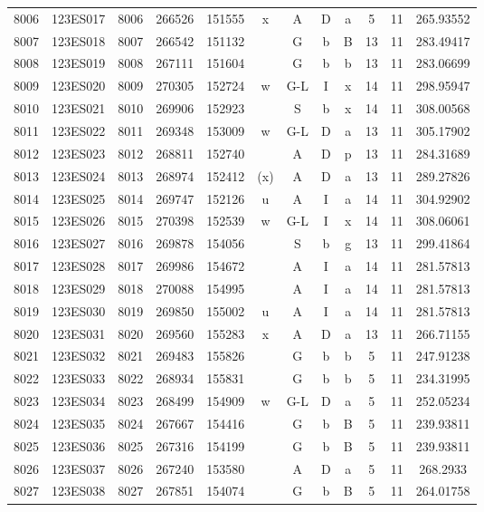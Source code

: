 \begin{tabular}{|*{12}{c|}}
8006 & 123ES017 & 8006 & 266526 & 151555 & x & A & D & a & 5 & 11 & 265.93552 \\ 
8007 & 123ES018 & 8007 & 266542 & 151132 &  & G & b & B & 13 & 11 & 283.49417 \\ 
8008 & 123ES019 & 8008 & 267111 & 151604 &  & G & b & b & 13 & 11 & 283.06699 \\ 
8009 & 123ES020 & 8009 & 270305 & 152724 & w & G-L & I & x & 14 & 11 & 298.95947 \\ 
8010 & 123ES021 & 8010 & 269906 & 152923 &  & S & b & x & 14 & 11 & 308.00568 \\ 
8011 & 123ES022 & 8011 & 269348 & 153009 & w & G-L & D & a & 13 & 11 & 305.17902 \\ 
8012 & 123ES023 & 8012 & 268811 & 152740 &  & A & D & p & 13 & 11 & 284.31689 \\ 
8013 & 123ES024 & 8013 & 268974 & 152412 & (x) & A & D & a & 13 & 11 & 289.27826 \\ 
8014 & 123ES025 & 8014 & 269747 & 152126 & u & A & I & a & 14 & 11 & 304.92902 \\ 
8015 & 123ES026 & 8015 & 270398 & 152539 & w & G-L & I & x & 14 & 11 & 308.06061 \\ 
8016 & 123ES027 & 8016 & 269878 & 154056 &  & S & b & g & 13 & 11 & 299.41864 \\ 
8017 & 123ES028 & 8017 & 269986 & 154672 &  & A & I & a & 14 & 11 & 281.57813 \\ 
8018 & 123ES029 & 8018 & 270088 & 154995 &  & A & I & a & 14 & 11 & 281.57813 \\ 
8019 & 123ES030 & 8019 & 269850 & 155002 & u & A & I & a & 14 & 11 & 281.57813 \\ 
8020 & 123ES031 & 8020 & 269560 & 155283 & x & A & D & a & 13 & 11 & 266.71155 \\ 
8021 & 123ES032 & 8021 & 269483 & 155826 &  & G & b & b & 5 & 11 & 247.91238 \\ 
8022 & 123ES033 & 8022 & 268934 & 155831 &  & G & b & b & 5 & 11 & 234.31995 \\ 
8023 & 123ES034 & 8023 & 268499 & 154909 & w & G-L & D & a & 5 & 11 & 252.05234 \\ 
8024 & 123ES035 & 8024 & 267667 & 154416 &  & G & b & B & 5 & 11 & 239.93811 \\ 
8025 & 123ES036 & 8025 & 267316 & 154199 &  & G & b & B & 5 & 11 & 239.93811 \\ 
8026 & 123ES037 & 8026 & 267240 & 153580 &  & A & D & a & 5 & 11 & 268.2933 \\ 
8027 & 123ES038 & 8027 & 267851 & 154074 &  & G & b & B & 5 & 11 & 264.01758 \\ 

\end{tabular}
